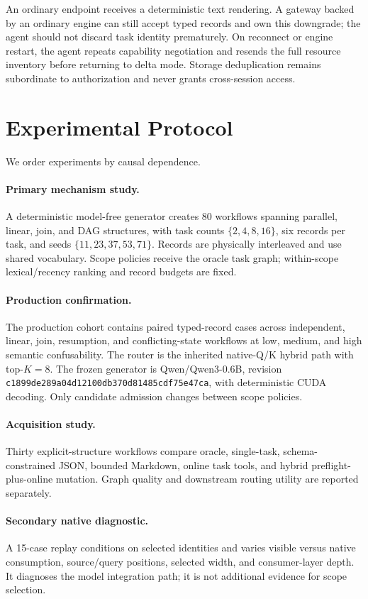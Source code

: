 \documentclass[10pt]{article}
\begin{document}
An ordinary endpoint receives a deterministic text rendering. A gateway backed
by an ordinary engine can still accept typed records and own this downgrade;
the agent should not discard task identity prematurely. On reconnect or engine
restart, the agent repeats capability negotiation and resends the full resource
inventory before returning to delta mode. Storage deduplication remains
subordinate to authorization and never grants cross-session access.

\section{Experimental Protocol}
We order experiments by causal dependence.

\paragraph{Primary mechanism study.}
A deterministic model-free generator creates 80 workflows spanning parallel, linear, join, and DAG structures, with task counts $\{2,4,8,16\}$, six records per task, and seeds $\{11,23,37,53,71\}$. Records are physically interleaved and use shared vocabulary. Scope policies receive the oracle task graph; within-scope lexical/recency ranking and record budgets are fixed.

\paragraph{Production confirmation.}
The production cohort contains \ProductionCases{} paired typed-record cases across independent, linear, join, resumption, and conflicting-state workflows at low, medium, and high semantic confusability. The router is the inherited native-Q/K hybrid path with top-$K=8$. The frozen generator is Qwen/Qwen3-0.6B, revision \texttt{c1899de289a04d12100db370d81485cdf75e47ca}, with deterministic CUDA decoding. Only candidate admission changes between scope policies.

\paragraph{Acquisition study.}
Thirty explicit-structure workflows compare oracle, single-task, schema-constrained JSON, bounded Markdown, online task tools, and hybrid preflight-plus-online mutation. Graph quality and downstream routing utility are reported separately.

\paragraph{Secondary native diagnostic.}
A 15-case replay conditions on selected identities and varies visible versus native consumption, source/query positions, selected width, and consumer-layer depth. It diagnoses the model integration path; it is not additional evidence for scope selection.
\end{document}
